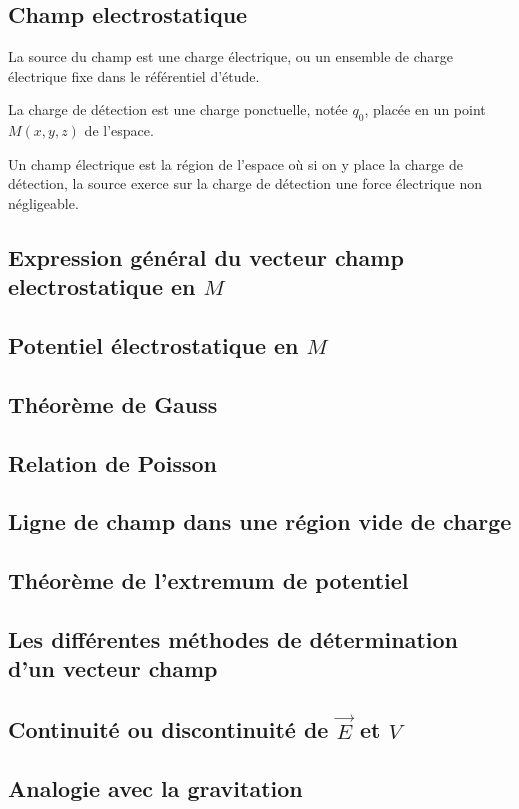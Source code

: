 \documentclass[lecture.tex]{subfiles}
\begin{document}
\subsection{Champ electrostatique}

  La source du champ est une charge électrique, ou un ensemble de charge électrique fixe dans le référentiel d'étude.

  La charge de détection est une charge ponctuelle, notée $q_0$, placée en un point $M(x,y,z)$ de l'espace.

  Un champ électrique est la région de l'espace où si on y place la charge de détection, la source exerce sur la charge de détection une force électrique non négligeable.

\medskip

\subsection{Expression général du vecteur champ electrostatique en $M$}

\subsection{Potentiel électrostatique en $M$}

\subsection{Théorème de Gauss}

\subsection{Relation de Poisson}

\subsection{Ligne de champ dans une région vide de charge}

\subsection{Théorème de l'extremum de potentiel}

\subsection{Les différentes méthodes de détermination d'un vecteur champ}

\subsection{Continuité ou discontinuité de $\vec{E}$ et $V$}

\subsection{Analogie avec la gravitation}
\end{document}
